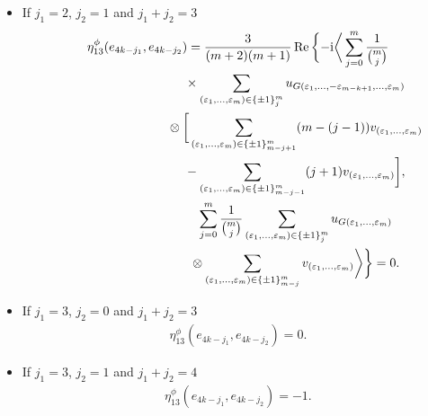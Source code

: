 \documentclass[pdftex]{sigma}
\numberwithin{equation}{section}
\begin{document}
\begin{enumerate}
\begin{itemize}
\begin{gather*}
 = \frac{-3}{(m+2)(m+1)}\sum_{j=0}^{m}\frac{1}{{m\choose j}}\bigg[ {-}{{{m-1}\choose{j-1}}}{{m\choose
{m-j+1}}}\\
\hphantom{\eta_{13}^\phi(e_{4k-j_1},e_{4k-j_2})=}{}\times
\frac{1}{{m\choose{j-1}}}{(m-j+1)} {{- {{m-1}\choose j}}{{m}\choose{m-j-1}}}
 \frac{1}{{m\choose
{j+1}}}(j+1)\bigg] \\
\hphantom{\eta_{13}^\phi(e_{4k-j_1},e_{4k-j_2})}{}
 = \frac{-3}{m(m+2)(m+1)}\sum_{j=0}^{m}\big(2j^2-2mj-m\big)=1.
\end{gather*}
\item[ii)] If $j_1=2$, $j_2=1$ and $j_1+j_2=3$
\begin{gather*}
 \eta_{13}^\phi(e_{4k-j_1},e_{4k-j_2}) =
 \frac{3}{(m+2)(m+1)}\operatorname{Re}\bigg\{ {-}{\rm i}\bigg\langle \sum_{j=0}^{m}\frac{1}{{m\choose
j}}\\
\hphantom{\eta_{13}^\phi(e_{4k-j_1},e_{4k-j_2}) =}{}\times
\sum_{(\varepsilon_{1},\dots ,\varepsilon_{m})\in\{\pm 1\}_{j}^{m}}u_{G(\varepsilon_{1},\dots,
-\varepsilon_{m-k+1},\dots,\varepsilon_{m})}\\
\hphantom{\eta_{13}^\phi(e_{4k-j_1},e_{4k-j_2}) =}{}
\otimes\bigg[ \sum_{(\varepsilon_{1},\dots, \varepsilon_{m})\in\{\pm
1\}_{m-j+1}^{m}}(m-(j-1))v_{(\varepsilon_{1},\dots,\varepsilon_m)}\\
\hphantom{\eta_{13}^\phi(e_{4k-j_1},e_{4k-j_2}) =}{}
-\sum_{(\varepsilon_{1},\dots, \varepsilon_{m})\in\{\pm
1\}_{m-j-1}^{m}}(j+1)v_{(\varepsilon_{1},\dots,\varepsilon_m)}\bigg] ,\\
\hphantom{\eta_{13}^\phi(e_{4k-j_1},e_{4k-j_2}) =}{}
 \sum_{j=0}^{m}\frac{1}{{m\choose j}}\sum_{(\varepsilon_{1},\dots, \varepsilon_{m})\in\{\pm
1\}_{j}^{m}}u_{G(\varepsilon_1,\dots,\varepsilon_m)}\\
\hphantom{\eta_{13}^\phi(e_{4k-j_1},e_{4k-j_2}) =}{}
\otimes
\sum_{(\varepsilon_{1},\dots ,\varepsilon_{m})\in\{\pm 1\}_{m-j}^{m}}v_{(\varepsilon_1,\dots,\varepsilon_m)}\bigg\rangle\bigg\} =0.
\end{gather*}
\item[iii)] If $j_1=3$, $j_2=0$ and $j_1+j_2=3$
\begin{gather*}
 \eta_{13}^\phi(e_{4k-j_1},e_{4k-j_2}) =0.
\end{gather*}
\item[iv)] If $j_1=3$, $j_2=1$ and $j_1+j_2=4$
\begin{gather*}
 \eta_{13}^\phi(e_{4k-j_1},e_{4k-j_2})=-1.
\end{gather*}
\end{itemize}
\end{enumerate}
\end{document}
